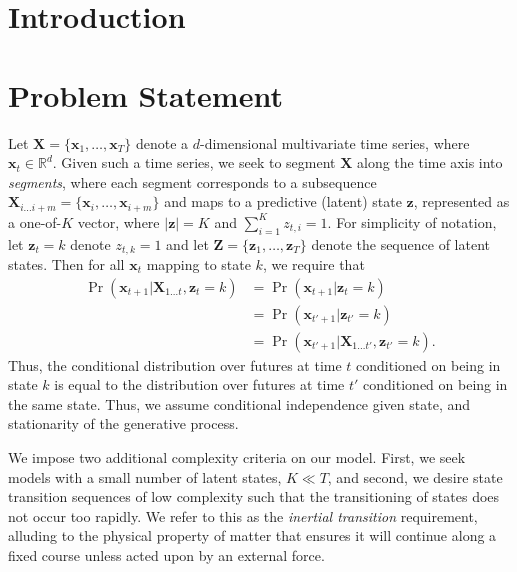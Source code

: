 \documentclass[12pt]{article}
\begin{document}
\section{Introduction}



\section{Problem Statement}

Let $\mathbf{X} = \{\mathbf{x}_1, \ldots, \mathbf{x}_T\}$ denote a $d$-dimensional multivariate time series, where $\mathbf{x}_t \in \mathbb{R}^d$. Given such a time series, we seek to segment $\mathbf{X}$ along the time axis into \emph{segments}, where each segment corresponds to a subsequence $\mathbf{X}_{i\ldots i+m} = \{\mathbf{x}_i, \ldots, \mathbf{x}_{i+m}\}$ and maps to a predictive (latent) state $\mathbf{z}$, represented as a one-of-$K$ vector, where $|\mathbf{z}| = K$ and $\sum_{i=1}^{K}z_{t,i} = 1$. For simplicity of notation, let $\mathbf{z}_{t} = k$ denote $z_{t,k} = 1$ and let $\mathbf{Z} = \{\mathbf{z}_1, \ldots, \mathbf{z}_T\}$ denote the sequence of latent states. Then for all $\mathbf{x}_{t}$ mapping to state $k$, we require that
\begin{align*}
    \Pr(\mathbf{x}_{t+1}|\mathbf{X}_{1\ldots t}, \mathbf{z}_t = k) &= \Pr(\mathbf{x}_{t+1}| \mathbf{z}_t = k) \\
                                                                   &= \Pr(\mathbf{x}_{t'+1}| \mathbf{z}_{t'} = k) \\
                                                                   &= \Pr(\mathbf{x}_{t'+1}| \mathbf{X}_{1\ldots t'}, \mathbf{z}_{t'} = k).
\end{align*}
Thus, the conditional distribution over futures at time $t$ conditioned on being in state $k$ is equal to the distribution over futures at time $t'$ conditioned on being in the same state. Thus, we assume conditional independence given state, and stationarity of the generative process.

We impose two additional complexity criteria on our model. First, we seek models with a small number of latent states, $K \ll T$, and second, we desire state transition sequences of low complexity such that the transitioning of states does not occur too rapidly. We refer to this as the \emph{inertial transition} requirement, alluding to the physical property of matter that ensures it will continue along a fixed course unless acted upon by an external force. 
\end{document}
